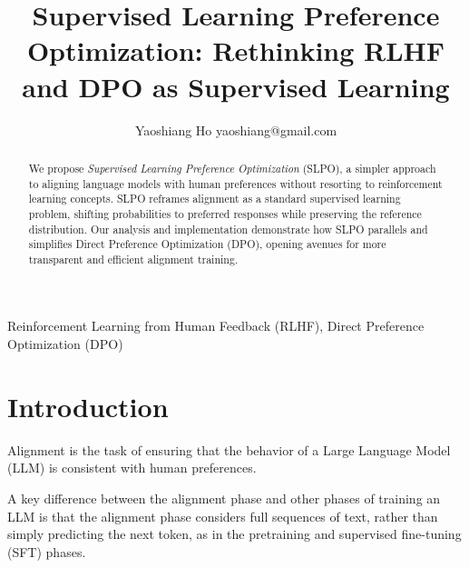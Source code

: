 \documentclass[twoside,11pt]{article}
\begin{document}
\title{Supervised Learning Preference Optimization: Rethinking RLHF and DPO as Supervised Learning}

\author{\name Yaoshiang Ho \email yaoshiang@gmail.com \\
      }

\editor{}

\maketitle 

\begin{abstract}%
We propose \emph{Supervised Learning Preference Optimization} (SLPO), 
a simpler approach to aligning language models with human preferences 
without resorting to reinforcement learning concepts. SLPO reframes 
alignment as a standard supervised learning problem, shifting 
probabilities to preferred responses while preserving the 
reference distribution. Our analysis and implementation demonstrate 
how SLPO parallels and simplifies Direct Preference Optimization (DPO), 
opening avenues for more transparent and efficient alignment training.  
\end{abstract}

\begin{keywords}
  Reinforcement Learning from Human Feedback (RLHF), Direct Preference Optimization (DPO)
\end{keywords}

\section{Introduction}

Alignment is the task of ensuring that the behavior of a
Large Language Model (LLM) is consistent 
with human preferences. 

A key difference between the alignment phase and
other phases of training an LLM is that the alignment phase considers
full sequences of text, rather than simply predicting the next token, as
in the pretraining and supervised fine-tuning (SFT) phases. 
\end{document}

